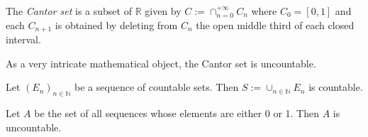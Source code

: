 \begin{defn}
  \label{def:CantorSet}
  The \emph{Cantor set} is a subset of $\mathbb{R}$
  given by $C:=\cap_{n=0}^{+\infty} C_n$
  where $C_0=[0,1]$
  and each $C_{n+1}$ is obtained
  by deleting from $C_n$ the open middle third
  of each closed interval. %
\end{defn}

\begin{rem}
  As a very intricate mathematical object, 
  the Cantor set is uncountable.
\end{rem}

\begin{thm}
  \label{thm:coutableSequenceUnion}
  Let $(E_n)_{n\in\mathbb{N}}$ be a sequence of countable sets.
  Then $S:=\cup_{n\in\mathbb{N}}E_n$ is countable.
\end{thm}

\begin{thm}
  \label{thm:uncountableSequenceOf0and1}
  Let $A$ be the set of all sequences whose elements
  are either 0 or 1.
  Then $A$ is uncountable. 
\end{thm}

